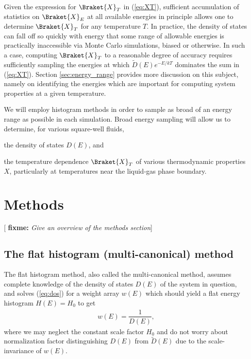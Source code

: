 \documentclass[11pt]{article}
\newcommand{\bk}{\Braket} %
\newcommand{\f}[2]{\dfrac{#1}{#2}} %
\newcommand{\p}[1]{\left(#1\right)} %
\newcommand{\red}[1]{{\bf \color{red} #1}}
\newcommand{\fixme}[1]{[\red{fixme:} \emph{#1}]}
\begin{document}
Given the expression for $\bk{X}_T$ in (\ref{eq:XT}), sufficient
accumulation of statistics on $\bk{X}_E$ at all available energies in
principle allows one to determine $\bk{X}_T$ for any temperature
$T$. In practice, the density of states can fall off so quickly with
energy that some range of allowable energies is practically
inaccessible via Monte Carlo simulations, biased or otherwise. In such
a case, computing $\bk{X}_T$ to a reasonable degree of accuracy
requires sufficiently sampling the energies at which $\tilde
D\p{E}e^{-E/kT}$ dominates the sum in (\ref{eq:XT}). Section
\ref{sec:energy_range} provides more discussion on this subject,
namely on identifying the energies which are important for computing
system properties at a given temperature.

We will employ histogram methods in order to sample as broad of an
energy range as possible in each simulation. Broad energy sampling
will allow us to determine, for various square-well fluids,
\begin{enumerate*}[label=\roman*)]
\item the density of states $D\p{E}$, and
\item the temperature dependence $\bk{X}_T$ of various thermodynamic
  properties $X$, particularly at temperatures near the liquid-gas
  phase boundary.
\end{enumerate*}


\section{Methods}
\label{sec:methods}

\fixme{Give an overview of the methods section}

\subsection{The flat histogram (multi-canonical) method}
\label{sec:flat_historam}

The flat histogram method, also called the multi-canonical method,
assumes complete knowledge of the density of states $D\p{E}$ of the
system in question, and solves (\ref{eq:dos}) for a weight array
$w\p{E}$ which should yield a flat energy histogram $H\p E=H_0$ to get
\begin{align}
  w\p E=\f1{D\p E},
  \label{eq:flat_weights}
\end{align}
where we may neglect the constant scale factor $H_0$ and do not worry
about normalization factor distinguishing $D\p{E}$ from $\tilde
D\p{E}$ due to the scale-invariance of $w\p{E}$.
\end{document}
